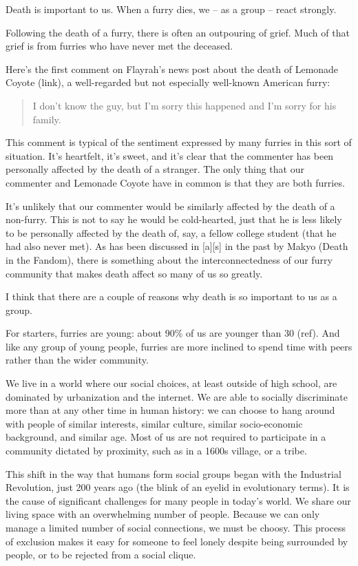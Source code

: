 
Death is important to us. When a furry dies, we -- as a group -- react strongly.

Following the death of a furry, there is often an outpouring of grief. Much of that grief is from furries who have never met the deceased.

Here's the first comment on Flayrah's news post about the death of Lemonade Coyote (link), a well-regarded but not especially well-known American furry:

\begin{quote}
  I don't know the guy, but I'm sorry this happened and I'm sorry for his family.
\end{quote}

This comment is typical of the sentiment expressed by many furries in this sort of situation. It's heartfelt, it's sweet, and it's clear that the commenter has been personally affected by the death of a stranger. The only thing that our commenter and Lemonade Coyote have in common is that they are both furries.

It's unlikely that our commenter would be similarly affected by the death of a non-furry. This is not to say he would be cold-hearted, just that he is less likely to be personally affected by the death of, say, a fellow college student (that he had also never met). As has been discussed in [a][s] in the past by Makyo (Death in the Fandom), there is something about the interconnectedness of our furry community that makes death affect so many of us so greatly.

I think that there are a couple of reasons why death is so important to us as a group.

For starters, furries are young: about 90\% of us are younger than 30 (ref). And like any group of young people, furries are more inclined to spend time with peers rather than the wider community.

We live in a world where our social choices, at least outside of high school, are dominated by urbanization and the internet. We are able to socially discriminate more than at any other time in human history: we can choose to hang around with people of similar interests, similar culture, similar socio-economic background, and similar age. Most of us are not required to participate in a community dictated by proximity, such as in a 1600s village, or a tribe.

This shift in the way that humans form social groups began with the Industrial Revolution, just 200 years ago (the blink of an eyelid in evolutionary terms). It is the cause of significant challenges for many people in today's world. We share our living space with an overwhelming number of people. Because we can only manage a limited number of social connections, we must be choosy. This process of exclusion makes it easy for someone to feel lonely despite being surrounded by people, or to be rejected from a social clique.

